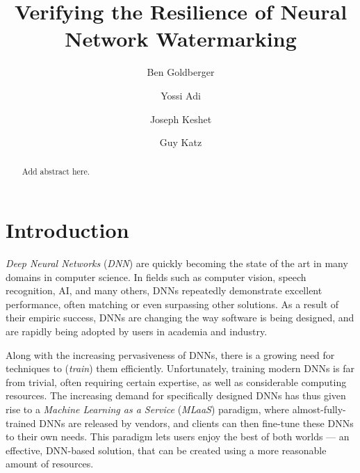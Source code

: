 \documentclass{easychair}
\newcommand{\guy}[1]{\marginpar{\textcolor{orange}{Guy: #1}}}
\begin{document}
\title{Verifying the Resilience of Neural Network Watermarking}
\author{
Ben Goldberger \and
Yossi Adi \and
Joseph Keshet \and
Guy Katz
}

\maketitle


\begin{abstract}
   Add abstract here.
 \end{abstract}

\section{Introduction}

\guy{Should we make the title more general? E.g., something like
  ``Fine-Tuning of Deep Neural Networks using Verification''}


\emph{Deep Neural Networks} (\emph{DNN}) are quickly becoming the
state of the art in many domains in computer science.  In fields such
as computer vision, speech recognition, AI, and many others, DNNs
repeatedly demonstrate excellent performance, often matching or even
surpassing other solutions.  As a result of their empiric success,
DNNs are changing the way software is being designed, and are rapidly
being adopted by users in academia and industry.

Along with the increasing pervasiveness of DNNs, there is a growing
need for techniques to (\emph{train}) them efficiently. Unfortunately,
training modern DNNs is far from trivial, often requiring certain
expertise, as well as considerable computing resources. The increasing
demand for specifically designed DNNs has thus given rise to a
\emph{Machine Learning as a Service} (\emph{MLaaS}) paradigm, where
almost-fully-trained DNNs are released by vendors, and clients can
then fine-tune these DNNs to their own needs. This paradigm lets users
enjoy the best of both worlds --- an effective, DNN-based solution,
that can be created using a more reasonable amount of resources.
\end{document}
